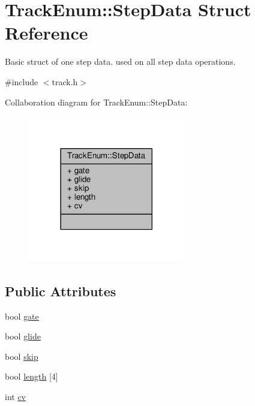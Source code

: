 \hypertarget{structTrackEnum_1_1StepData}{\section{Track\-Enum\-:\-:Step\-Data Struct Reference}
\label{structTrackEnum_1_1StepData}
}


Basic struct of one step data. used on all step data operations.  




{\ttfamily \#include $<$track.\-h$>$}



Collaboration diagram for Track\-Enum\-:\-:Step\-Data\-:\nopagebreak
\begin{figure}[H]
\begin{center}
\leavevmode
\includegraphics[width=194pt]{structTrackEnum_1_1StepData__coll__graph}
\end{center}
\end{figure}
\subsection*{Public Attributes}
\begin{DoxyCompactItemize}
\item 
bool \hyperlink{structTrackEnum_1_1StepData_aa3df1cd3696c931e7b6195155de793b1}{gate}
\item 
bool \hyperlink{structTrackEnum_1_1StepData_a63ba552973c563c9b677f6be06d5a01d}{glide}
\item 
bool \hyperlink{structTrackEnum_1_1StepData_abbd1dda2c86c1aacc7c5cbe2b03f0e52}{skip}
\item 
bool \hyperlink{structTrackEnum_1_1StepData_a5f859558e1945dea556c102912e27411}{length} \mbox{[}4\mbox{]}
\item 
int \hyperlink{structTrackEnum_1_1StepData_ace50a5d33cf24a4e6f6b91cc97b85643}{cv}
\end{DoxyCompactItemize}


